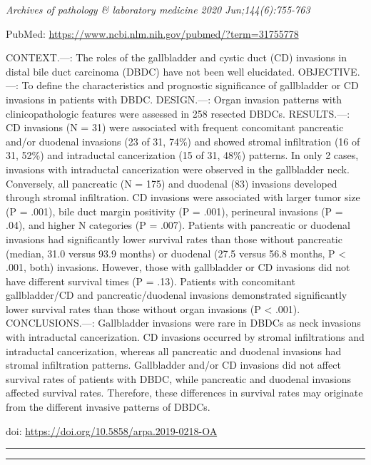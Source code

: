 \documentclass[
]{article}
\begin{document}
\emph{Archives of pathology \& laboratory medicine 2020
Jun;144(6):755-763}

PubMed: \url{https://www.ncbi.nlm.nih.gov/pubmed/?term=31755778}

CONTEXT.---: The roles of the gallbladder and cystic duct (CD) invasions
in distal bile duct carcinoma (DBDC) have not been well elucidated.
OBJECTIVE.---: To define the characteristics and prognostic significance
of gallbladder or CD invasions in patients with DBDC. DESIGN.---: Organ
invasion patterns with clinicopathologic features were assessed in 258
resected DBDCs. RESULTS.---: CD invasions (N = 31) were associated with
frequent concomitant pancreatic and/or duodenal invasions (23 of 31,
74\%) and showed stromal infiltration (16 of 31, 52\%) and intraductal
cancerization (15 of 31, 48\%) patterns. In only 2 cases, invasions with
intraductal cancerization were observed in the gallbladder neck.
Conversely, all pancreatic (N = 175) and duodenal (83) invasions
developed through stromal infiltration. CD invasions were associated
with larger tumor size (P = .001), bile duct margin positivity (P =
.001), perineural invasions (P = .04), and higher N categories (P =
.007). Patients with pancreatic or duodenal invasions had significantly
lower survival rates than those without pancreatic (median, 31.0 versus
93.9 months) or duodenal (27.5 versus 56.8 months, P \textless{} .001,
both) invasions. However, those with gallbladder or CD invasions did not
have different survival times (P = .13). Patients with concomitant
gallbladder/CD and pancreatic/duodenal invasions demonstrated
significantly lower survival rates than those without organ invasions (P
\textless{} .001). CONCLUSIONS.---: Gallbladder invasions were rare in
DBDCs as neck invasions with intraductal cancerization. CD invasions
occurred by stromal infiltrations and intraductal cancerization, whereas
all pancreatic and duodenal invasions had stromal infiltration patterns.
Gallbladder and/or CD invasions did not affect survival rates of
patients with DBDC, while pancreatic and duodenal invasions affected
survival rates. Therefore, these differences in survival rates may
originate from the different invasive patterns of DBDCs.

doi: \url{https://doi.org/10.5858/arpa.2019-0218-OA}

\begin{center}\rule{0.5\linewidth}{0.5pt}\end{center}

\begin{center}\rule{0.5\linewidth}{0.5pt}\end{center}
\end{document}
